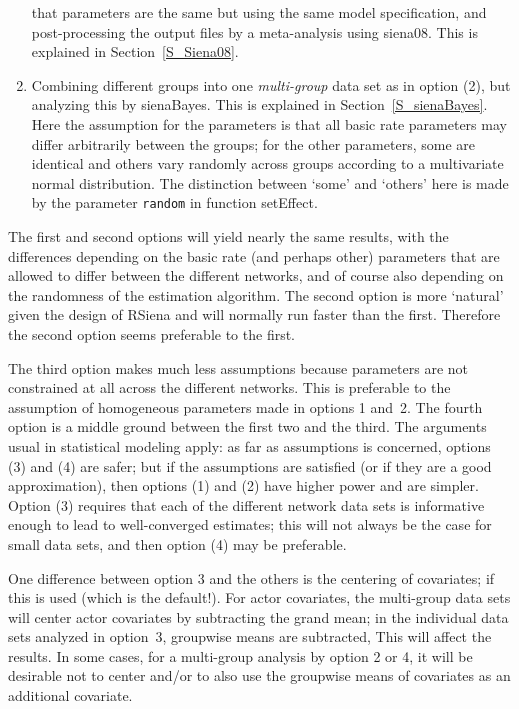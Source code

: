 \documentclass[a4paper,fleqn,11pt]{article}
\newcommand{\+}{\, + \,}
\newcommand{\sfn}[1]{\textsf{#1}}
\newcommand{\RS}{{\sf \textsf{RSiena} }}
\begin{document}
\begin{enumerate}
      that parameters are the same but using the same model specification,
      and post-processing the output files by a meta-analysis
      using \textsf{siena08}.
      This is explained in Section~\ref{S_Siena08}.
\item Combining different groups into one \emph{multi-group} data set
      as in option (2), but analyzing this by \textsf{sienaBayes}.
      This is explained in Section~\ref{S_sienaBayes}.\\
      Here the assumption for the parameters is that all basic rate parameters
      may differ arbitrarily between the groups;
      for the other parameters, some are identical and others vary randomly across
      groups according to a multivariate normal distribution.
      The distinction between `some' and `others' here is made by
      the parameter \texttt{random} in function \sfn{setEffect}.
\end{enumerate}
The first and second options will yield nearly the same results, with the
differences depending on the basic rate (and perhaps other) parameters
that are
allowed to differ between the different networks, and of course
also depending on the randomness of the estimation algorithm.
The second option is more `natural' given the design of \RS and
will normally run faster than the first.
Therefore the second option seems preferable to the first.

The third option makes much less assumptions because parameters are not
constrained at all across the different networks.
This is preferable to the assumption of homogeneous parameters
made in options 1 and~2.
The fourth option is a middle ground between the first two and the third.
The arguments usual in statistical modeling apply:
as far as assumptions is concerned, options (3) and (4) are safer;
but if the assumptions are satisfied (or if they are a good approximation),
then options (1) and (2) have higher power and are simpler.
Option (3) requires that each of the different network data sets
is informative enough to lead to well-converged estimates;
this will not always be the case for small data sets,
and then option (4) may be preferable.

One difference between option 3 and the others is the centering of covariates;
if this is used (which is the default!).
For actor covariates, the multi-group data sets will center actor covariates
by subtracting the grand mean; in the individual data sets analyzed in option~3,
groupwise means are subtracted, This will affect the results.
In some cases, for a multi-group analysis by option 2 or 4, it will be desirable
not to center and/or to also use the groupwise means of covariates
as an additional covariate.
\end{document}
